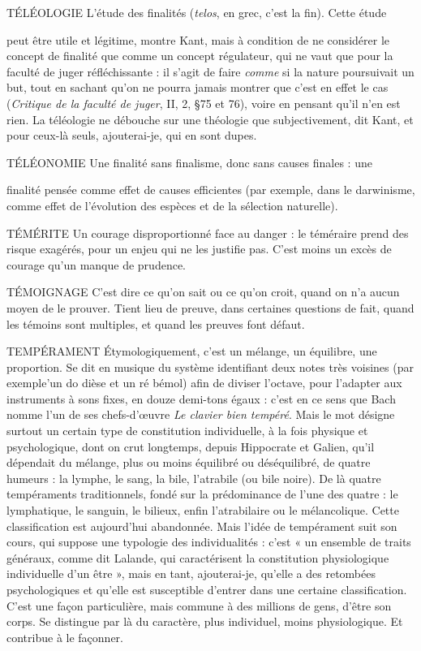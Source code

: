 TÉLÉOLOGIE L'étude des finalités ({\it telos}, en grec, c’est la fin). Cette étude

peut être utile et légitime, montre Kant, mais à condition de
ne considérer le concept de finalité que comme un concept régulateur, qui ne
vaut que pour la faculté de juger réfléchissante : il s’agit de faire {\it comme} si la
nature poursuivait un but, tout en sachant qu’on ne pourra jamais montrer que
c’est en effet le cas ({\it Critique de la faculté de juger}, II, 2, \S 75 et 76), voire en
pensant qu’il n’en est rien. La téléologie ne débouche sur une théologie que
subjectivement, dit Kant, et pour ceux-là seuls, ajouterai-je, qui en sont dupes.

TÉLÉONOMIE Une finalité sans finalisme, donc sans causes finales : une

finalité pensée comme effet de causes efficientes (par
exemple, dans le darwinisme, comme effet de l’évolution des espèces et de la
sélection naturelle).

TÉMÉRITE Un courage disproportionné face au danger : le téméraire prend
des risque exagérés, pour un enjeu qui ne les justifie pas. C’est
moins un excès de courage qu’un manque de prudence.

TÉMOIGNAGE C’est dire ce qu’on sait ou ce qu’on croit, quand on n’a
aucun moyen de le prouver. Tient lieu de preuve, dans certaines
questions de fait, quand les témoins sont multiples, et quand les preuves
font défaut.

TEMPÉRAMENT Étymologiquement, c’est un mélange, un équilibre, une
proportion. Se dit en musique du système identifiant
deux notes très voisines (par exemple’un do dièse et un ré bémol) afin de
diviser l’octave, pour l’adapter aux instruments à sons fixes, en douze demi-tons
égaux : c’est en ce sens que Bach nomme l’un de ses chefs-d’œuvre {\it Le
clavier bien tempéré}. Mais le mot désigne surtout un certain type de constitution
individuelle, à la fois physique et psychologique, dont on crut longtemps,
depuis Hippocrate et Galien, qu’il dépendait du mélange, plus ou
moins équilibré ou déséquilibré, de quatre humeurs : la lymphe, le sang, la
bile, l’atrabile (ou bile noire). De là quatre tempéraments traditionnels,
fondé sur la prédominance de l’une des quatre : le lymphatique, le sanguin,
le bilieux, enfin l’atrabilaire ou le mélancolique. Cette classification est
aujourd’hui abandonnée. Mais l’idée de tempérament suit son cours, qui
suppose une typologie des individualités : c’est « un ensemble de traits généraux,
comme dit Lalande, qui caractérisent la constitution physiologique
individuelle d’un être », mais en tant, ajouterai-je, qu’elle a des retombées
psychologiques et qu’elle est susceptible d’entrer dans une certaine classification.
C’est une façon particulière, mais commune à des millions de gens,
d’être son corps. Se distingue par là du caractère, plus individuel, moins physiologique.
Et contribue à le façonner.

